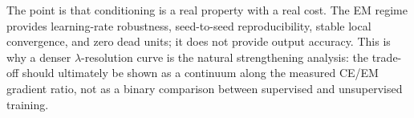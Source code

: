 The point is that conditioning is a real property with a real cost. The EM
regime provides learning-rate robustness, seed-to-seed reproducibility, stable
local convergence, and zero dead units; it does not provide output accuracy.
This is why a denser $\lambda$-resolution curve is the natural strengthening
analysis: the trade-off should ultimately be shown as a continuum along the
measured CE/EM gradient ratio, not as a binary comparison between supervised
and unsupervised training.

